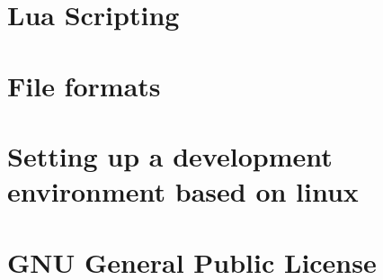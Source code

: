 \documentclass[a4paper,12pt]{refrep}
\begin{document}
\chapter{Lua Scripting}\label{cha:lua}


\chapter{File formats}\label{cha:file_formats}





\appendix

\chapter{Setting up a development environment based on linux}\label{cha:developmentsetup}


\chapter{GNU General Public License}\label{cha:gnu-general-public}

\end{document}
